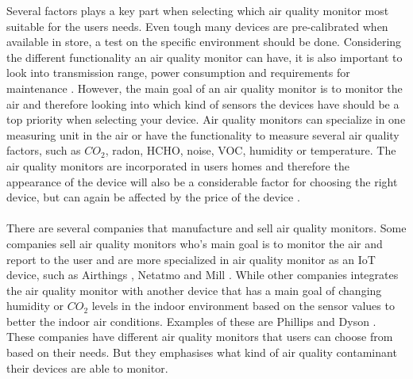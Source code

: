 Several factors plays a key part when selecting which air quality monitor most suitable for the users needs. Even tough many devices are pre-calibrated when available in store, a test on the specific environment should be done. Considering the different functionality an air quality monitor can have, it is also important to look into transmission range, power consumption and requirements for maintenance \cite{AQMBigSource}. However, the main goal of an air quality monitor is to monitor the air and therefore looking into which kind of sensors the devices have should be a top priority when selecting your device. Air quality monitors can specialize in one measuring unit in the air or have the functionality to measure several air quality factors, such as \(CO_2\), radon, HCHO, noise, VOC, humidity or temperature. The air quality monitors are incorporated in users homes and therefore the appearance of the device will also be a considerable factor for choosing the right device, but can again be affected by the price of the device \cite{IAQMonitorCommunicationReview}. 
\\\\
There are several companies that manufacture and sell air quality monitors. Some companies sell air quality monitors who's main goal is to monitor the air and report to the user and are more specialized in air quality monitor as an IoT device, such as Airthings \cite{Airthings}, Netatmo \cite{Netatmo} and Mill \cite{Mill}. While other companies integrates the air quality monitor with another device that has a main goal of changing humidity or \(CO_2\) levels in the indoor environment based on the sensor values to better the indoor air conditions. Examples of these are Phillips \cite{Philips} and Dyson \cite{Dyson}. These companies have different air quality monitors that users can choose from based on their needs. But they emphasises what kind of air quality contaminant their devices are able to monitor. 
\\\\

